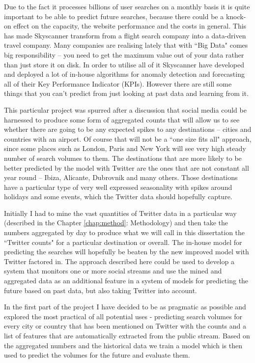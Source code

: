 \documentclass[minf,twoside,singlespacing,parskip,frontabs,notimes,11pt]{infthesis}
\begin{document}
Due to the fact it processes billions of user searches on a monthly basis it is quite important to be able to predict future searches, because there could be a knock-on effect on the capacity, the website performance and the costs in general. This has made Skyscanner transform from a flight search company into a data-driven travel company. Many companies are realising lately that with ``Big Data" comes big responsibility -- you need to get the maximum value out of your data rather than just store it on disk. In order to utilise all of it Skyscanner have developed and deployed a lot of in-house algorithms for anomaly detection and forecasting all of their Key Performance Indicator (KPIs). However there are still some things that you can't predict from just looking at past data and learning from it.


This particular project was spurred after a discussion that social media could be harnessed to produce some form of aggregated counts that will allow us to see whether there are going to be any expected spikes to any destinations -- cities and countries with an airport. Of course that will not be a ``one size fits all" approach, since some places such as London, Paris and New York will see very high steady number of search volumes to them. The destinations that are more likely to be better predicted by the model with Twitter are the ones that are not constant all year round -- Ibiza, Alicante, Dubrovnik and many others. Those destinations have a particular type of very well expressed seasonality with spikes around holidays and some events, which the Twitter data should hopefully capture.


Initially I had to mine the vast quantities of Twitter data in a particular way (described in the  Chapter \ref{chap:method}: Methodology) and then take the numbers aggregated by day to produce what we will call in this dissertation the ``Twitter counts" for a particular destination or overall. The in-house model for predicting the searches will hopefully be beaten by the new improved model with Twitter factored in. The approach described here could be used to develop a system that monitors one or more social streams and use the mined and aggregated data as an additional feature in a system of models for predicting the future based on past data, but also taking Twitter into account.


In the first part of the project I have decided to be as pragmatic as possible and explored the most practical of all potential uses - predicting search volumes for every city or country that has been mentioned on Twitter with the counts and a list of features that are automatically extracted from the public stream. Based on the aggregated numbers and the historical data we train a model which is then used to predict the volumes for the future and evaluate them.
\end{document}
